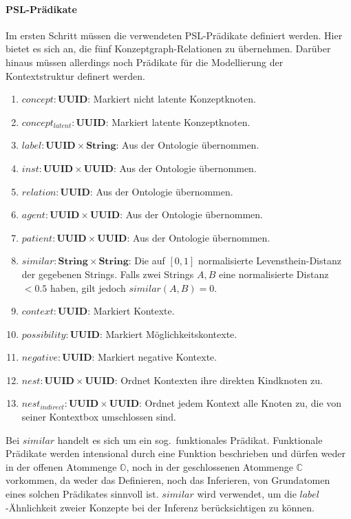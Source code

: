 \paragraph{PSL-Prädikate}
Im ersten Schritt müssen die verwendeten PSL-Prädikate definiert werden.
Hier bietet es sich an, die fünf Konzeptgraph-Relationen zu übernehmen.
Darüber hinaus müssen allerdings noch Prädikate für die Modellierung der Kontextstruktur definert werden.
\begin{enumerate}[noitemsep]
	\item $concept: \textbf{UUID}$: Markiert nicht latente Konzeptknoten.
	\item $concept_{latent}: \textbf{UUID}$: Markiert latente Konzeptknoten.
	\item $label: \textbf{UUID} \times \textbf{String}$: Aus der Ontologie übernommen.
	\item $inst: \textbf{UUID} \times \textbf{UUID}$: Aus der Ontologie übernommen.
	\item $relation: \textbf{UUID}$: Aus der Ontologie übernommen.
	\item $agent: \textbf{UUID} \times \textbf{UUID}$: Aus der Ontologie übernommen.
	\item $patient: \textbf{UUID} \times \textbf{UUID}$: Aus der Ontologie übernommen.
	\item $similar: \textbf{String} \times \textbf{String}$: Die auf $[0, 1]$ normalisierte Levensthein-Distanz der gegebenen Strings.
		Falls zwei Strings $A, B$ eine normalisierte Distanz~$< 0.5$ haben, gilt jedoch $similar(A, B) = 0$.
	\item $context: \textbf{UUID}$: Markiert Kontexte.
	\item $possibility: \textbf{UUID}$: Markiert Möglichkeitskontexte.
	\item $negative: \textbf{UUID}$: Markiert negative Kontexte.
	\item $nest: \textbf{UUID} \times \textbf{UUID}$: Ordnet Kontexten ihre direkten Kindknoten zu.
	\item $nest_{indirect}: \textbf{UUID} \times \textbf{UUID}$: Ordnet jedem Kontext alle Knoten zu, die von seiner Kontextbox umschlossen sind.
\end{enumerate}

Bei $similar$ handelt es sich um ein sog.\ funktionales Prädikat.
Funktionale Prädikate werden intensional durch eine Funktion beschrieben und dürfen weder in der offenen Atommenge $\mathbb{O}$, noch in der geschlossenen Atommenge $\mathbb{C}$ vorkommen, da weder das Definieren, noch das Inferieren, von Grundatomen eines solchen Prädikates sinnvoll ist.
$similar$ wird verwendet, um die $label$-Ähnlichkeit zweier Konzepte bei der Inferenz berücksichtigen zu können.

